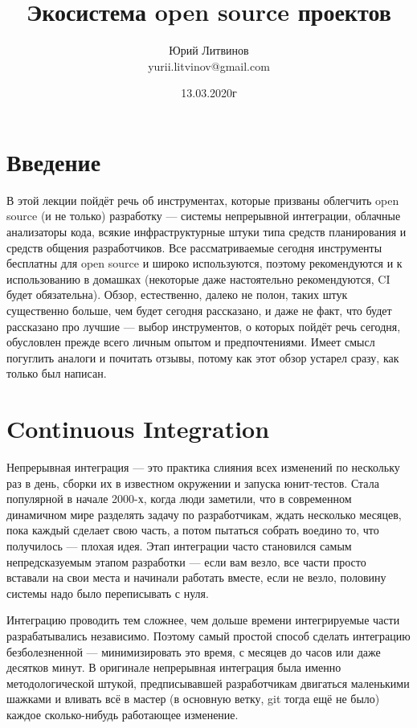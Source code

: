 \documentclass[a5paper]{article}
\title{Экосистема open source проектов}
\author{Юрий Литвинов\\\small{yurii.litvinov@gmail.com}}
\date{13.03.2020г}
\begin{document}
\maketitle
\thispagestyle{empty}

\section{Введение}

В этой лекции пойдёт речь об инструментах, которые призваны облегчить open source (и не только) разработку --- системы непрерывной интеграции, облачные анализаторы кода, всякие инфраструктурные штуки типа средств планирования и средств общения разработчиков. Все рассматриваемые сегодня инструменты бесплатны для open source и широко используются, поэтому рекомендуются и к использованию в домашках (некоторые даже настоятельно рекомендуются, CI будет обязательна). Обзор, естественно, далеко не полон, таких штук существенно больше, чем будет сегодня рассказано, и даже не факт, что будет рассказано про лучшие --- выбор инструментов, о которых пойдёт речь сегодня, обусловлен прежде всего личным опытом и предпочтениями. Имеет смысл погуглить аналоги и почитать отзывы, потому как этот обзор устарел сразу, как только был написан.

\section{Continuous Integration}

Непрерывная интеграция --- это практика слияния всех изменений по нескольку раз в день, сборки их в известном окружении и запуска юнит-тестов. Стала популярной в начале 2000-х, когда люди заметили, что в современном динамичном мире разделять задачу по разработчикам, ждать несколько месяцев, пока каждый сделает свою часть, а потом пытаться собрать воедино то, что получилось --- плохая идея. Этап интеграции часто становился самым непредсказуемым этапом разработки --- если вам везло, все части просто вставали на свои места и начинали работать вместе, если не везло, половину системы надо было переписывать с нуля. 

Интеграцию проводить тем сложнее, чем дольше времени интегрируемые части разрабатывались независимо. Поэтому самый простой способ сделать интеграцию безболезненной --- минимизировать это время, с месяцев до часов или даже десятков минут. В оригинале непрерывная интеграция была именно методологической штукой, предписывавшей разработчикам двигаться маленькими шажками и вливать всё в мастер (в основную ветку, git тогда ещё не было) каждое сколько-нибудь работающее изменение.
\end{document}
